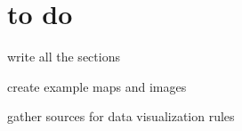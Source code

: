 \section{to do}

\noindent write all the sections

\noindent create example maps and images

\noindent gather sources for data visualization rules

